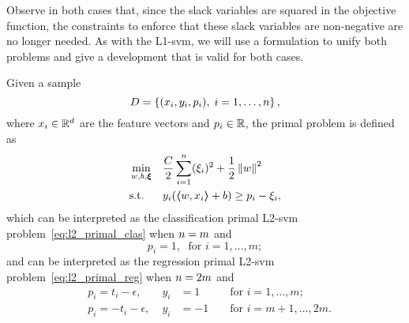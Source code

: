 %
Observe in both cases that, since the slack variables are squared in the objective function, the constraints to enforce that these slack variables are non-negative are no longer needed.
As with the L1-\acrshort{svm}, we will use a formulation to unify both problems and give a development that is valid for both cases. 
%
%
\begin{definition}
    Given a sample
    $$ D = \left\{(x_i, y_i, p_i), \; i=1, \ldots, n\right\} ,$$
    where $x_i \in \mathbb{R}^d$ are the feature vectors and $p_i \in \mathbb{R}$, 
    the primal problem is defined as
    \begin{equation}
        \label{eq:l2_primal}
        \begin{aligned}
            &\min_{w, b, \fv{\xi}} & & \frac{C}{2} \sum_{i=1}^\nsamples (\xi_i)^2 + \frac{1}{2} \norm{w}^2 \\
            & \text{s.t.} & & y_i (\dotp{w}{x_i} + b) \geq p_i - \xi_i ,     
        \end{aligned}  
    \end{equation}
    which can be interpreted as the classification primal L2-\acrshort{svm} problem~\eqref{eq:l2_primal_clas} when $n=m$ and
    $$ p_i = 1,\; \text{ for } i=1, \ldots, m ;$$
    and can be interpreted as the regression primal L2-\acrshort{svm} problem~\eqref{eq:l2_primal_reg} when $n = 2 m$ and
    \begin{equation}
        \nonumber
        \begin{aligned}
            & p_i = t_i - \epsilon ,\; &y_i &= 1 &&\text{ for } i=1, \ldots, m ; \\
            & p_i = -t_i - \epsilon ,\; &y_i &= -1 &&\text{ for } i=m+1, \ldots, 2m .
        \end{aligned}
    \end{equation}
\end{definition}
%
